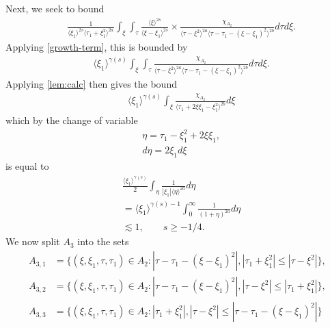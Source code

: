\documentclass[12pt,reqno]{amsart}
\numberwithin{equation}{section}  %
\begin{document}
%
%
Next, we seek to bound
\begin{equation*}
\begin{split}
  &  \frac{1}{\langle \xi_{1} \rangle ^{2s}
  \langle \tau_{1} + \xi_{1}^{2}  \rangle
  ^{2a}} \int_{\xi} \int_{\tau} \frac{\langle \xi \rangle ^{2s}}{\langle
  \xi - \xi_{1}\rangle ^{2s}}  \times \frac{\chi_{A_{2}}}{\langle
  \tau - \xi^{2} \rangle ^{2a} \langle \tau - \tau_{1} - (\xi -
  \xi_{1})^{2} \rangle^{2b} } d \tau d \xi.
\end{split}
\end{equation*}
Applying \eqref{growth-term}, this is bounded by
\begin{equation*}
\begin{split}
  &  \langle \xi_{1} \rangle ^{\gamma(s)}
   \int_{\xi} \int_{\tau} \frac{\chi_{A_{2}}}{\langle
  \tau - \xi^{2} \rangle ^{2a} \langle \tau - \tau_{1} - (\xi -
  \xi_{1})^{2} \rangle^{2b} } d \tau d \xi.
\end{split}
\end{equation*}
Applying \cref{lem:calc} then gives the bound
\begin{equation*}
\begin{split}
  & \langle \xi_{1} \rangle ^{\gamma(s)} \int_{\xi} \frac{\chi_{A_{2}} }{\langle
  \tau_{1} + 2 \xi \xi_{1} - \xi_{1}^{2} \rangle^{2b} } d \xi
\end{split}
\end{equation*}
which by the change of variable
%
%
\begin{equation*}
\begin{split}
  & \eta = \tau_{1} - \xi_{1}^{2} + 2 \xi \xi_{1},
  \\
  & d \eta = 2 \xi_{1} d \xi
\end{split}
\end{equation*}
%
%
is equal to
%
%
\begin{equation*}
\begin{split}
  & \frac{\langle \xi_{1} \rangle^{\gamma(s)}}{2}  \int_{\eta} 
  \frac{1}{| \xi_{1} |\langle \eta \rangle ^{2a} }d \eta
  \\
  & = \langle \xi_{1} \rangle ^{\gamma(s) -1} \int_{0}^{\infty} \frac{1}{(1 + \eta
  )^{2a}}d \eta
  \\
  & \lesssim 1, \qquad s \ge -1/4.
\end{split}
\end{equation*}
%
%
We now split $A_{3}$ into the sets
%
%
%
\begin{align*}
A_{3,1}&=\{(\xi, \xi_1, \tau, \tau_1)\in A_2:
|\tau-\tau_1-(\xi-\xi_1)^2|, |\tau_1+\xi_1^2| \le |\tau-\xi^2|\},\\
A_{3,2}&=\{(\xi, \xi_1, \tau, \tau_1)\in A_2:
|\tau-\tau_1-(\xi-\xi_1)^2|, |\tau-\xi^2| \le |\tau_1+\xi_1^2|\},\\
A_{3,3}&=\{(\xi, \xi_1, \tau, \tau_1)\in A_2: |\tau_{1}+\xi_{1}^2|, | \tau - \xi^{2} | \le |  \tau - \tau_{1} -
(\xi - \xi_{1})^{2} |\}
\end{align*} 
\end{document}
